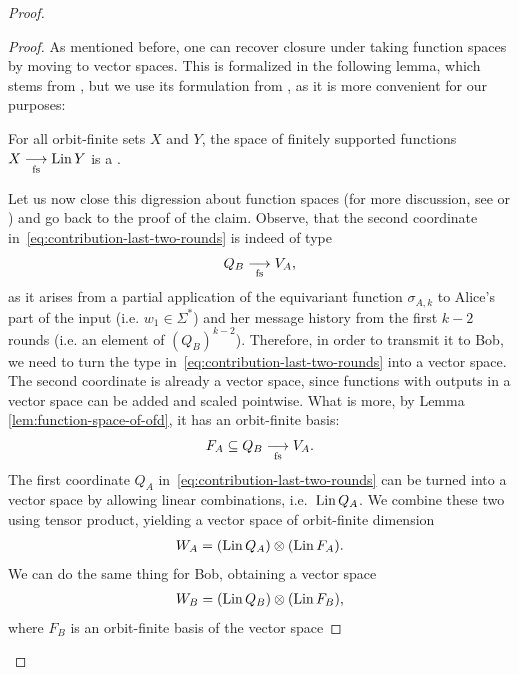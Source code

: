 \begin{proof}
\begin{proof}
      As mentioned before, one can recover closure under taking function spaces by moving to vector spaces. This is formalized in the following lemma, which stems 
      from \cite{orbitFiniteVectorTheoretics}, but we use its formulation from \cite{bojanczyk_slightly}, as it is more convenient for our purposes:
      \begin{lemma}
      \label{lem:function-space-of-ofd}
            For all orbit-finite sets $X$ and $Y$, the space of finitely supported functions $X \underset{\text{fs}}{\longrightarrow} \operatorname{Lin} Y$ is a .
      \end{lemma}
      Let us now close this digression about function spaces (for more discussion, see \cite[Section 8.3]{bojanczyk_slightly} or \cite{functionSpaces2024})
      and go back to the proof of the claim. Observe, that the second coordinate in~\eqref{eq:contribution-last-two-rounds} is indeed of type 
      \begin{align*}
      Q_B \underset{\text{fs}}{\longrightarrow} V_A,
      \end{align*}
      as it arises from a partial application of the equivariant function $\sigma_{A,k}$ to Alice's part of the input (i.e. $w_1 \in \Sigma^*$)
      and her message history from the first $k-2$ rounds (i.e. an element of $(Q_B)^{k-2}$). Therefore, in order to transmit it to Bob, 
      we need to turn the type in~\eqref{eq:contribution-last-two-rounds} into a vector space. The second coordinate is already a vector space,
      since functions with outputs in a vector space can be added and scaled pointwise. What is more, by Lemma \ref{lem:function-space-of-ofd},
      it has an orbit-finite basis:
      \begin{align*}
        F_A \subseteq Q_B \underset{\text{fs}}{\longrightarrow} V_A.  
      \end{align*}
      The first coordinate $Q_A$ in~\eqref{eq:contribution-last-two-rounds} can be turned into a vector space by  allowing linear combinations, i.e.~$\operatorname{Lin} Q_A$. We combine these two using tensor product, yielding a vector space of orbit-finite dimension
        \begin{align*}
           W_A =  (\operatorname{Lin} Q_A) \otimes (\operatorname{Lin} F_A).
        \end{align*}
        We can do the same thing for Bob, obtaining a vector space
        \begin{align*}
           W_B =  (\operatorname{Lin} Q_B) \otimes (\operatorname{Lin} F_B),
        \end{align*}
        where $F_B$ is an orbit-finite basis of the vector space 

\end{proof}
\end{proof}
